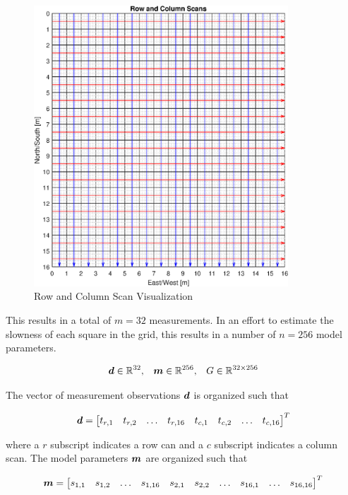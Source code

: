 \begin{figure}[h] 
	\centering
	\includegraphics[width=0.85\textwidth]{./images/prob2_partA_scans_vizualization.eps}
	\caption{Row and Column Scan Visualization}
	\label{fig: prob2 part A row column scan viz}
\end{figure}
\FloatBarrier

This results in a total of $m = 32$ measurements. In an effort to estimate the slowness of each square in the grid, this results in a number of $n = 256$ model parameters. 

\begin{align*}
	\boldsymbol{d} \in \mathbb{R}^{32},\,\,\,\,\,\boldsymbol{m} \in \mathbb{R}^{256},\,\,\,\,\,G \in \mathbb{R}^{32 \times 256}
\end{align*}

The vector of measurement observations $\boldsymbol{d}$ is organized such that

\begin{align*}
	\boldsymbol{d} = \begin{bmatrix}
		t_{r,1} & t_{r,2} & \ldots & t_{r,16} & t_{c,1} & t_{c,2} & \ldots & t_{c,16}
	\end{bmatrix}^T
\end{align*}

where a $r$ subscript indicates a row can and a $c$ subscript indicates a column scan. The model parameters $\boldsymbol{m}$ are organized such that

\begin{align*}
	\boldsymbol{m} = \begin{bmatrix}
		s_{1,1} & s_{1,2} & \ldots & s_{1,16} & s_{2,1} & s_{2,2} & \ldots & s_{16,1} & \ldots & s_{16,16}
	\end{bmatrix}^T
\end{align*}

